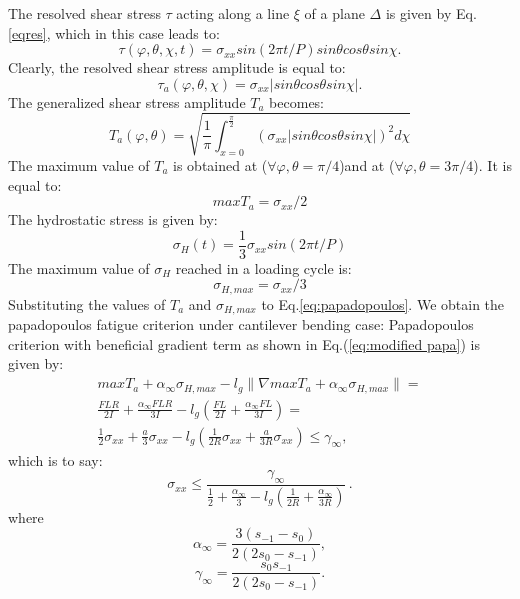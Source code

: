 \documentclass[3p,times,procedia,number]{elsarticle}
\begin{document}
The resolved shear stress $\tau$ acting along a line $\xi$ of a plane $\Delta$ is given by Eq.\ref{eqres}, which in this case leads to:
\begin{equation}
\tau(\varphi,\theta,\chi,t)=\sigma_{xx}sin(2\pi t/P)sin\theta cos\theta sin\chi.
\end{equation}
Clearly, the resolved shear stress amplitude is equal to:
\begin{equation}
\tau_a(\varphi,\theta,\chi)=\sigma_{xx}|sin\theta cos\theta sin\chi|.
\end{equation}
The generalized shear stress amplitude $T_a$ becomes:
\begin{equation}
T_a(\varphi,\theta)=\sqrt{\frac{1}{\pi}\int_{x=0}^{\frac{\pi}{2}}(\sigma_{xx}|sin\theta cos\theta sin\chi|)^2d\chi}
\end{equation}
The maximum value of $T_a$ is obtained at ($\forall\varphi,\theta=\pi/4$)and at ($\forall\varphi,\theta=3\pi/4$). It is equal to:
\begin{equation}
maxT_a=\sigma_{xx}/2
\end{equation}
The hydrostatic stress is given by:
\begin{equation}
\sigma_{H}(t)=\frac{1}{3}\sigma_{xx}sin(2\pi t/P)
\end{equation}
The maximum value of $\sigma_H$ reached in a loading cycle is:
\begin{equation}
\sigma_{H,max}=\sigma_{xx}/3
\end{equation}
Substituting the values of $T_a$ and $\sigma_{H,max}$ to Eq.\eqref{eq:papadopoulos}. We obtain the papadopoulos fatigue criterion under cantilever bending case:
Papadopoulos criterion with beneficial gradient term as shown in Eq.(\eqref{eq:modified papa}) is given by:
\begin{equation}
\begin{split}
maxT_a+\alpha_\infty\sigma_{H,max}-l_g\parallel\nabla{maxT_a}+\alpha_\infty\sigma_{H,max}\parallel=\\ \frac{FLR}{2I} +\frac{\alpha_\infty FLR}{3I}-l_g(\frac{FL}{2I}+\frac{\alpha_\infty FL}{3I})=\\ \frac{1}{2}\sigma_{xx}+\frac{a}{3}\sigma_{xx}-l_g(\frac{1}{2R}\sigma_{xx}+\frac{a}{3R}\sigma_{xx})\leqslant \gamma_\infty ,
\end{split}
\end{equation}
which is to say:
\begin{equation}
\sigma_{xx}\leqslant\frac{\gamma_\infty}{\frac{1}{2}+\frac{\alpha_\infty}{3}-l_g(\frac{1}{2R}+\frac{\alpha_\infty}{3R})}\, .
\end{equation}
where
$$\alpha_\infty=\frac{3(s_{-1}-s_0)}{2(2s_0-s_{-1})},$$
$$\gamma_\infty=\frac{s_0s_{-1}}{2(2s_0-s_{-1})}.$$
\end{document}
